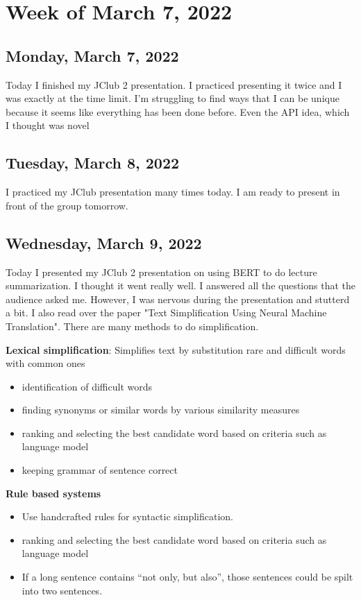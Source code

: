 \documentclass[11pt,letterpaper]{article}
\begin{document}
\section{Week of March 7, 2022}
\subsection{Monday, March 7, 2022}
Today I finished my JClub 2 presentation. I practiced presenting it twice and I was exactly at the time limit. I'm struggling to find ways that I can be unique because it seems like everything has been done before. Even the API idea, which I thought was novel

\subsection{Tuesday, March 8, 2022}
I practiced my JClub presentation many times today. I am ready to present in front of the group tomorrow.

\subsection{Wednesday, March 9, 2022}
Today I presented my JClub 2 presentation on using BERT to do lecture summarization. I thought it went really well. I answered all the questions that the audience asked me. However, I was nervous during the presentation and stutterd a bit. I also read over the paper "Text Simplification Using Neural Machine Translation". There are many methods to do simplification. 

\textbf{Lexical simplification}: Simplifies text by substitution rare and difficult words with common ones
\begin{itemize}
    \item identification of difficult words
    \item finding synonyms or similar words by various similarity measures
    \item ranking and selecting the best candidate word based on criteria such as language model
    \item keeping grammar of sentence correct
\end{itemize}

\textbf{Rule based systems}
\begin{itemize}
    \item Use handcrafted rules for syntactic simplification.
    \item ranking and selecting the best candidate word based on criteria such as language model
    \item If a long sentence contains “not only, but also”, those sentences could be spilt into two sentences.
\end{itemize}
\end{document}

